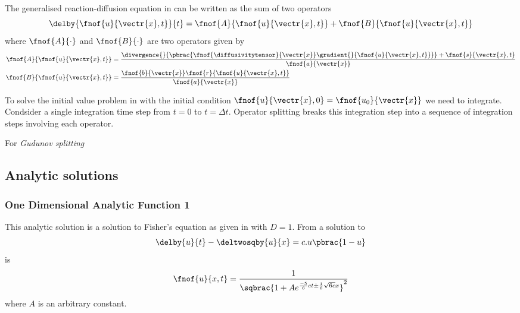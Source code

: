 The generalised reaction-diffusion equation in
 can be written as
the sum of two operators \ie
\begin{equation}
  \delby{\fnof{u}{\vectr{x},t}}{t}=\fnof{A}{\fnof{u}{\vectr{x},t}}+\fnof{B}{\fnof{u}{\vectr{x},t}}
  \label{eqn:ReactionDiffusionOperatorForm}
\end{equation}
where $\fnof{A}{\cdot}$ and $\fnof{B}{\cdot}$ are two operators given by
\begin{align}
  \fnof{A}{\fnof{u}{\vectr{x},t}}&=\dfrac{\divergence{}{\pbrac{\fnof{\diffusivitytensor}{\vectr{x}}
        \gradient{}{\fnof{u}{\vectr{x},t}}}}+\fnof{s}{\vectr{x},t}}{\fnof{a}{\vectr{x}}} \\
  \fnof{B}{\fnof{u}{\vectr{x},t}}&=\dfrac{\fnof{b}{\vectr{x}}\fnof{r}{\fnof{u}{\vectr{x},t}}}{\fnof{a}{\vectr{x}}}
\end{align}

To solve the initial value problem in
 with the initial condition
$\fnof{u}{\vectr{x},0}=\fnof{u_{0}}{\vectr{x}}$ we need to
integrate. Condsider a single integration time step \ie from $t=0$ to
$t=\Delta t$. Operator splitting breaks this integration step into a
sequence of integration steps involving each operator.

For \emph{Gudunov splitting} 

\subsection{Analytic solutions}
\label{subsec:ReactionDiffusionAnalyticSolutions}

\subsubsection{One Dimensional Analytic Function 1}

This analytic solution is a solution to Fisher's equation as given in
 with $D=1$. From
 a
solution to
\begin{equation}
  \delby{u}{t}-\deltwosqby{u}{x}=c.u\pbrac{1-u}
  \label{eqn:AnalyticReactionDiffusionFishersEquation}
\end{equation}
is
\begin{equation}
  \fnof{u}{x,t}=\dfrac{1}{\sqbrac{1+Ae^{\frac{-5}{6}ct\pm\frac{1}{6}\sqrt{6c}x}}^{2}}
  \label{eqn:AnalyticReactionDiffusionEquationOneDim1}
\end{equation}
where $A$ is an arbitrary constant.

